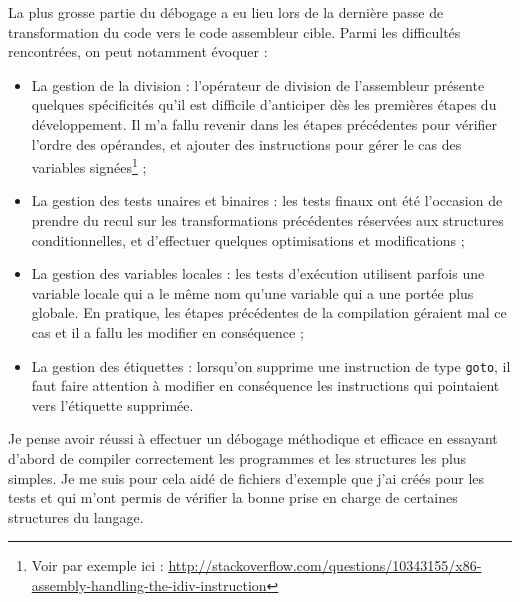 \documentclass[paper=a4, fontsize=11pt]{scrartcl}
\numberwithin{figure}{section}			%
\numberwithin{table}{section}				%
\begin{document}
La plus grosse partie du débogage a eu lieu lors de la dernière passe de transformation du code vers le code assembleur cible. Parmi les difficultés rencontrées, on peut notamment évoquer :

\begin{itemize}
\item La gestion de la division : l'opérateur de division de l'assembleur présente quelques spécificités qu'il est difficile d'anticiper dès les premières étapes du développement. Il m'a fallu revenir dans les étapes précédentes pour vérifier l'ordre des opérandes, et ajouter des instructions pour gérer le cas des variables signées\footnote{Voir par exemple ici : \url{http://stackoverflow.com/questions/10343155/x86-assembly-handling-the-idiv-instruction}} ;
\item La gestion des tests unaires et binaires : les tests finaux ont été l'occasion de prendre du recul sur les transformations précédentes réservées aux structures conditionnelles, et d'effectuer quelques optimisations et modifications ;
\item La gestion des variables locales : les tests d'exécution utilisent parfois une variable locale qui a le même nom qu'une variable qui a une portée plus globale. En pratique, les étapes précédentes de la compilation géraient mal ce cas et il a fallu les modifier en conséquence ;
\item La gestion des étiquettes : lorsqu'on supprime une instruction de type \texttt{goto}, il faut faire attention à modifier en conséquence les instructions qui pointaient vers l'étiquette supprimée.
\end{itemize}

Je pense avoir réussi à effectuer un débogage méthodique et efficace en essayant d'abord de compiler correctement les programmes et les structures les plus simples. Je me suis pour cela aidé de fichiers d'exemple que j'ai créés pour les tests et qui m'ont permis de vérifier la bonne prise en charge de certaines structures du langage.
\end{document}
